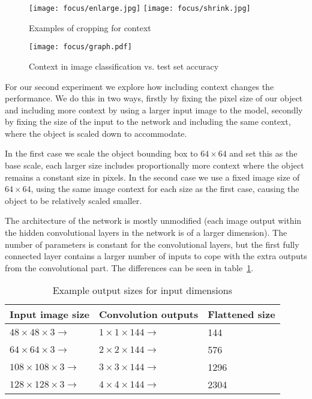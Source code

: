 \begin{figure*}[t]
    \caption{Examples of cropping for context}
\centering
\texttt{[image: focus/enlarge.jpg]}
\texttt{[image: focus/shrink.jpg]}
\label{fig:context}
\end{figure*}




\begin{figure}[h]
    \caption{Context in image classification vs. test set accuracy}
\centering
\texttt{[image: focus/graph.pdf]}
\label{fig:exp2}
\end{figure}

For our second experiment we explore how including context changes the performance. We do this in two ways, firstly by fixing the pixel size of our object and including more context by using a larger input image to the model, secondly by fixing the size of the input to the network and including the same context, where the object is scaled down to accommodate.

In the first case we scale the object bounding box to $ 64 \times 64 $ and set this as the base scale, each larger size includes proportionally more context where the object remains a constant size in pixels. In the second case we use a fixed image size of $ 64 \times 64 $, using the same image context for each size as the first case, causing the object to be relatively scaled smaller.

The architecture of the network is mostly unmodified (each image output within the hidden convolutional layers in the network is of a larger dimension). The number of parameters is constant for the convolutional layers, but the first fully connected layer contains a larger number of inputs to cope with the extra outputs from the convolutional part. The differences can be seen in table~\ref{fig:sizes}.


\begin{table}[h]
  \centering
    \caption{Example output sizes for input dimensions }
\begin{tabular}{ l l l } 
 
 \toprule
 Input image size & Convolution outputs & Flattened size \\
 \toprule
 
 $ 48 \times 48 \times 3 \rightarrow $ & $ 1\times1\times144 \rightarrow $ & 144 \\
 $ 64 \times 64 \times 3 \rightarrow $ & $ 2\times2\times144 \rightarrow $ & 576 \\
 $ 108 \times 108 \times 3 \rightarrow $ & $ 3\times3\times144 \rightarrow $ & 1296 \\
 $ 128 \times 128 \times 3 \rightarrow $ & $ 4\times4\times144 \rightarrow $ & 2304 \\
 
\end{tabular}
\label{fig:sizes}
\end{table}

